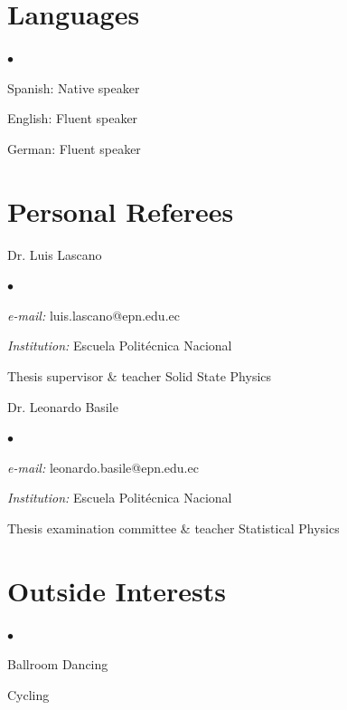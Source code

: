 \documentclass[margin,line]{res}
\newenvironment{list1}{
  \begin{list}{\ding{113}}{%
      \setlength{\itemsep}{0in}
      \setlength{\parsep}{0in} \setlength{\parskip}{0in}
      \setlength{\topsep}{0in} \setlength{\partopsep}{0in} 
      \setlength{\leftmargin}{0.17in}}}{\end{list}}
\newenvironment{list2}{
  \begin{list}{$\bullet$}{%
      \setlength{\itemsep}{0in}
      \setlength{\parsep}{0in} \setlength{\parskip}{0in}
      \setlength{\topsep}{0in} \setlength{\partopsep}{0in} 
      \setlength{\leftmargin}{0.2in}}}{\end{list}}
\begin{document}
\begin{resume}
\section{\sc Languages}
  \begin{list2}
    \item Spanish: Native speaker
    \item English: Fluent speaker
    \item German: Fluent speaker
  \end{list2}
  
\section{\sc Personal Referees}
 \begin{list1}
  \item[] Dr. Luis Lascano
  \begin{list2}
   \item {\it e-mail:} luis.lascano@epn.edu.ec
   \item {\it Institution:} Escuela Politécnica Nacional
   \item Thesis supervisor \& teacher Solid State Physics
  \end{list2}
 \end{list1}
 \begin{list1}
  \item[] Dr. Leonardo Basile
  \begin{list2}
   \item {\it e-mail:} leonardo.basile@epn.edu.ec
   \item {\it Institution:} Escuela Politécnica Nacional
   \item Thesis examination committee \& teacher Statistical Physics
  \end{list2}
 \end{list1}


\section{\sc Outside Interests}
 \begin{list2}
  \item Ballroom Dancing
  \item Cycling
 \end{list2}

\end{resume}
\end{document}
